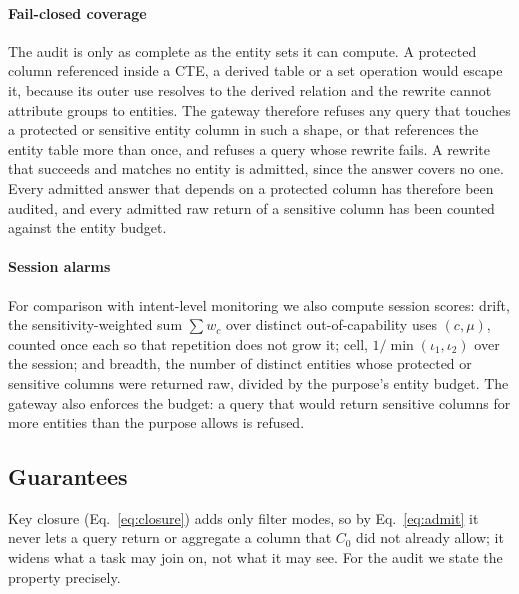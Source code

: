 \documentclass[10pt,journal,compsoc]{IEEEtran}
\begin{document}
\paragraph*{Fail-closed coverage} The audit is only as complete as the entity sets it can compute. A protected column referenced inside a CTE, a derived table or a set operation would escape it, because its outer use resolves to the derived relation and the rewrite cannot attribute groups to entities. The gateway therefore refuses any query that touches a protected or sensitive entity column in such a shape, or that references the entity table more than once, and refuses a query whose rewrite fails. A rewrite that succeeds and matches no entity is admitted, since the answer covers no one. Every admitted answer that depends on a protected column has therefore been audited, and every admitted raw return of a sensitive column has been counted against the entity budget.

\paragraph*{Session alarms} For comparison with intent-level monitoring we also compute session scores: drift, the sensitivity-weighted sum $\sum w_c$ over distinct out-of-capability uses $(c,\mu)$, counted once each so that repetition does not grow it; cell, $1/\min(\iota_1,\iota_2)$ over the session; and breadth, the number of distinct entities whose protected or sensitive columns were returned raw, divided by the purpose's entity budget. The gateway also enforces the budget: a query that would return sensitive columns for more entities than the purpose allows is refused.

\subsection{Guarantees}\label{sec:guarantees}
Key closure (Eq.~\ref{eq:closure}) adds only \textsf{filter} modes, so by Eq.~\ref{eq:admit} it never lets a query return or aggregate a column that $C_0$ did not already allow; it widens what a task may join on, not what it may see. For the audit we state the property precisely.
\end{document}
